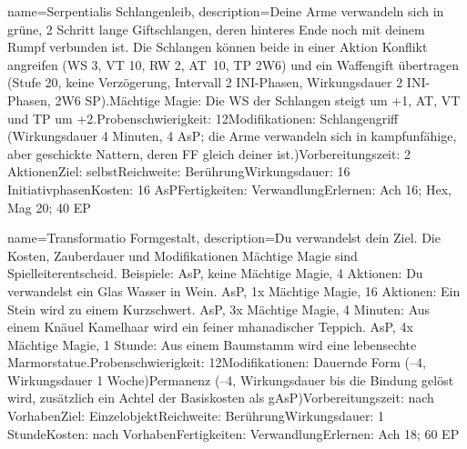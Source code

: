{
    name={Serpentialis Schlangenleib},
    description={Deine Arme verwandeln sich in grüne, 2 Schritt lange Giftschlangen, deren hinteres Ende noch mit deinem Rumpf verbunden ist. Die Schlangen können beide in einer Aktion Konflikt angreifen (WS 3, VT 10, RW 2, AT 10, TP 2W6) und ein Waffengift übertragen (Stufe 20, keine Verzögerung, Intervall 2 INI-Phasen, Wirkungsdauer 2 INI-Phasen, 2W6 SP).\newline Mächtige Magie: Die WS der Schlangen steigt um +1, AT, VT und TP um +2.\newline Probenschwierigkeit: 12\newline Modifikationen: Schlangengriff (Wirkungsdauer 4 Minuten, 4 AsP; die Arme verwandeln sich in kampfunfähige, aber geschickte Nattern, deren FF gleich deiner ist.)\newline Vorbereitungszeit: 2 Aktionen\newline Ziel: selbst\newline Reichweite: Berührung\newline Wirkungsdauer: 16 Initiativphasen\newline Kosten: 16 AsP\newline Fertigkeiten: Verwandlung\newline Erlernen: Ach 16; Hex, Mag 20; 40 EP}
}


{
    name={Transformatio Formgestalt},
    description={Du verwandelst dein Ziel. Die Kosten, Zauberdauer und Modifikationen Mächtige Magie sind Spielleiterentscheid. Beispiele: AsP, keine Mächtige Magie, 4 Aktionen: Du verwandelst ein Glas Wasser in Wein. AsP, 1x Mächtige Magie, 16 Aktionen: Ein Stein wird zu einem Kurzschwert. AsP, 3x Mächtige Magie, 4 Minuten: Aus einem Knäuel Kamelhaar wird ein feiner mhanadischer Teppich. AsP, 4x Mächtige Magie, 1 Stunde: Aus einem Baumstamm wird eine lebensechte Marmorstatue.\newline Probenschwierigkeit: 12\newline Modifikationen: Dauernde Form (–4, Wirkungsdauer 1 Woche)\newline Permanenz (–4, Wirkungsdauer bis die Bindung gelöst wird, zusätzlich ein Achtel der Basiskosten als gAsP)\newline Vorbereitungszeit: nach Vorhaben\newline Ziel: Einzelobjekt\newline Reichweite: Berührung\newline Wirkungsdauer: 1 Stunde\newline Kosten: nach Vorhaben\newline Fertigkeiten: Verwandlung\newline Erlernen: Ach 18; 60 EP}
}


